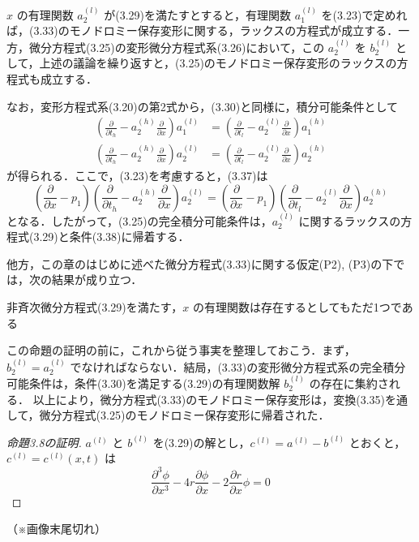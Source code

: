 \begin{story}
$x$ の有理関数 $a_2^{(l)}$ が(3.29)を満たすとすると，有理関数 $a_1^{(l)}$ を(3.23)で定めれば，(3.33)のモノドロミー保存変形に関する，ラックスの方程式が成立する．一方，微分方程式(3.25)の変形微分方程式系(3.26)において，この $a_2^{(l)}$ を $b_2^{(l)}$ として，上述の議論を繰り返すと，(3.25)のモノドロミー保存変形のラックスの方程式も成立する．

なお，変形方程式系(3.20)の第2式から，(3.30)と同様に，積分可能条件として
\begin{align}
    \left( \frac{\partial}{\partial t_h} - a_2^{(h)}\frac{\partial}{\partial x} \right) a_1^{(l)} &= \left( \frac{\partial}{\partial t_l} - a_2^{(l)}\frac{\partial}{\partial x} \right) a_1^{(h)} \label{eq:3.37} \\
    \left( \frac{\partial}{\partial t_h} - a_2^{(h)}\frac{\partial}{\partial x} \right) a_2^{(l)} &= \left( \frac{\partial}{\partial t_l} - a_2^{(l)}\frac{\partial}{\partial x} \right) a_2^{(h)} \label{eq:3.38}
\end{align}
が得られる．ここで，(3.23)を考慮すると，(3.37)は
\begin{equation*}
    \left( \frac{\partial}{\partial x} - p_1 \right)\left( \frac{\partial}{\partial t_h} - a_2^{(h)}\frac{\partial}{\partial x} \right) a_2^{(l)} = \left( \frac{\partial}{\partial x} - p_1 \right)\left( \frac{\partial}{\partial t_l} - a_2^{(l)}\frac{\partial}{\partial x} \right) a_2^{(h)}
\end{equation*}
となる．したがって，(3.25)の完全積分可能条件は，$a_2^{(l)}$ に関するラックスの方程式(3.29)と条件(3.38)に帰着する．

他方，この章のはじめに述べた微分方程式(3.33)に関する仮定(P2), (P3)の下では，次の結果が成り立つ．

\begin{proposition}[3.8]
非斉次微分方程式(3.29)を満たす，$x$ の有理関数は存在するとしてもただ1つである
\end{proposition}

この命題の証明の前に，これから従う事実を整理しておこう．まず，$b_2^{(l)} = a_2^{(l)}$ でなければならない．結局，(3.33)の変形微分方程式系の完全積分可能条件は，条件(3.30)を満足する(3.29)の有理関数解 $b_2^{(l)}$ の存在に集約される．
以上により，微分方程式(3.33)のモノドロミー保存変形は，変換(3.35)を通して，微分方程式(3.25)のモノドロミー保存変形に帰着された．

\begin{proof}[命題3.8の証明]
$a^{(l)}$ と $b^{(l)}$ を(3.29)の解とし，$c^{(l)} = a^{(l)} - b^{(l)}$ とおくと，$c^{(l)} = c^{(l)}(x,t)$ は
\begin{equation}
    \frac{\partial^3 \phi}{\partial x^3} - 4r\frac{\partial \phi}{\partial x} - 2\frac{\partial r}{\partial x}\phi = 0 \label{eq:3.39}
\end{equation}
\end{proof}
\end{story}
（※画像末尾切れ）

